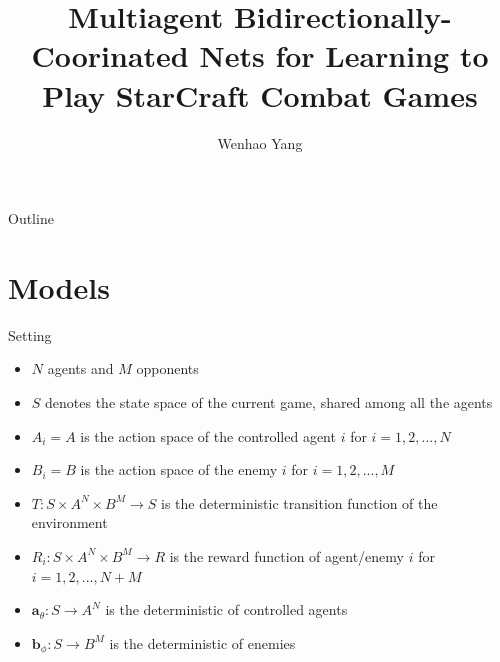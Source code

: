 \documentclass[mathserif]{beamer}
\begin{document}
\title{Multiagent Bidirectionally-Coorinated Nets for Learning to Play StarCraft
Combat Games}

\author{Wenhao Yang
}
\begin{frame}
  \titlepage
\end{frame}

\date{}

\begin{frame}{Outline}
\tableofcontents
\end{frame}

\section{Models}
\begin{frame}{Setting}
  \begin{itemize}
    \item $N$ agents and $M$ opponents
    \item $S$ denotes the state space of the current game, shared among all the agents
    \item $A_{i}=A$ is the action space of the controlled agent $i$ for $i=1,2,...,N$
    \item $B_{i}=B$ is the action space of the enemy $i$ for $i=1,2,...,M$
    \item $T:S\times A^{N}\times B^{M}\rightarrow S$ is the deterministic transition function of the environment
    \item $R_{i}:S\times A^{N}\times B^{M}\rightarrow R$ is the reward function of agent/enemy $i$ for $i=1,2,...,N+M$
    \item $\bm{a}_{\theta}:S\rightarrow A^{N}$ is the deterministic of controlled agents
    \item $\bm{b}_{\phi}:S\rightarrow B^{M}$ is the deterministic of enemies
  \end{itemize}
\end{frame}
\end{document}
